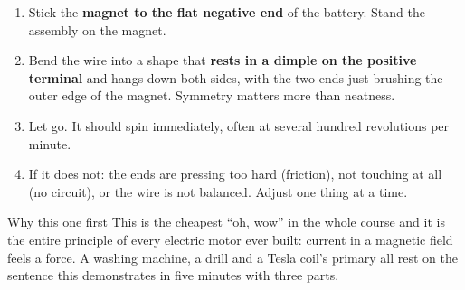 \begin{enumerate}
\item Stick the \textbf{magnet to the flat negative end} of the battery. Stand the assembly on the magnet.
\item Bend the wire into a shape that \textbf{rests in a dimple on the positive terminal} and hangs down both sides, with the two ends just brushing the outer edge of the magnet. Symmetry matters more than neatness.
\item Let go. It should spin immediately, often at several hundred revolutions per minute.
\item If it does not: the ends are pressing too hard (friction), not touching at all (no circuit), or the wire is not balanced. Adjust one thing at a time.
\end{enumerate}

\begin{telosfacts}[0.22]
\end{telosfacts}

\begin{telospanel}{Why this one first}
This is the cheapest ``oh, wow'' in the whole course and it is the entire
principle of every electric motor ever built: current in a magnetic field feels
a force. A washing machine, a drill and a Tesla coil's primary all rest on the
sentence this demonstrates in five minutes with three parts.
\end{telospanel}
\lowvoltagenote


